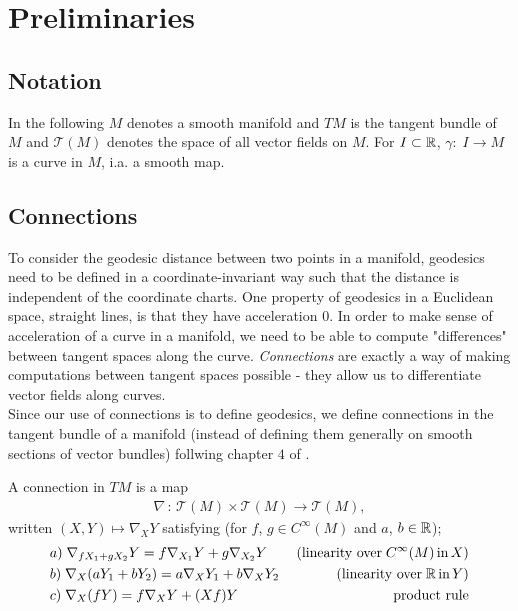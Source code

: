 \chapter{Preliminaries}

\section{Notation}

In the following $M$ denotes a smooth manifold and $TM$ is the tangent bundle of $M$ and $\mathcal{T}(M)$ denotes the space of all vector fields on $M$. For $I \subset \mathbb{R}$, $\gamma: \; I \rightarrow M$ is a curve in $M$, i.a. a smooth map.  

\section{Connections}

To consider the geodesic distance between two points in a manifold, geodesics need to be defined in a coordinate-invariant way such that the distance is independent of the coordinate charts. One property of geodesics in a Euclidean space, straight lines, is that they have acceleration $0$. In order to make sense of acceleration of a curve in a manifold, we need to be able to compute "differences" between tangent spaces along the curve. \textit{Connections} are exactly a way of making computations between tangent spaces possible - they allow us to differentiate vector fields along curves.\\[0.2 cm]
Since our use of connections is to define geodesics, we define connections in the tangent bundle of a manifold (instead of defining them generally on smooth sections of vector bundles) follwing chapter $4$ of \citet{RiemannLee}. 

\begin{definition}
A connection in $TM$ is a map
\begin{align*}
\nabla \, : \, \mathcal{T}(M) \times \mathcal{T}(M) \rightarrow \mathcal{T}(M),
\end{align*}
written $(X, Y) \mapsto \nabla_X Y$ satisfying (for $f$, $g \in C^\infty(M)$ and $a$, $b \in \mathbb{R}$);
\begin{align*}
& a) \; \nabla_{fX_1 + gX_2} Y = f\nabla_{X_1} Y + g\nabla_{X_2} Y \; \; \; \; & \text{(linearity over} \; C^\infty(M) \, \text{in} \, X) \\
& b) \; \nabla_X (aY_1 + bY_2) = a\nabla_X Y_1 + b\nabla_X Y_2 & \text{(linearity over} \; \mathbb{R} \, \text{in} \, Y) \\
& c) \; \nabla_X (fY) = f\nabla_X Y + (Xf)Y & \text{product rule}
\end{align*}
\end{definition}

